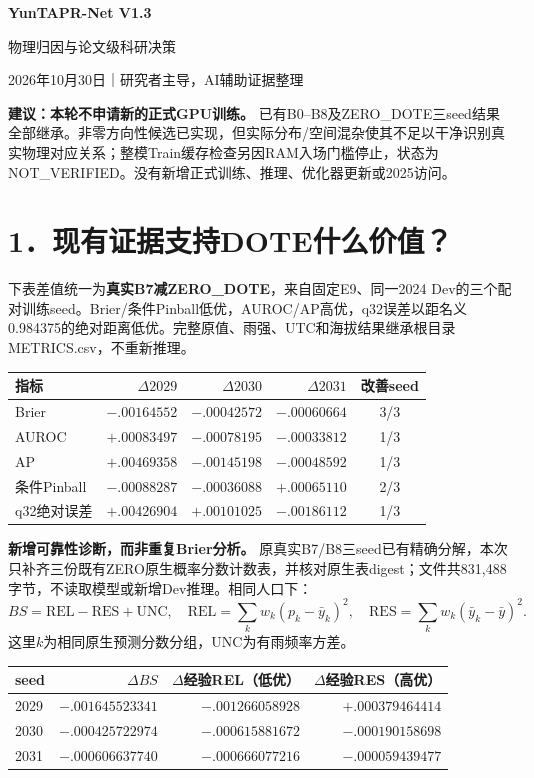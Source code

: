 \documentclass[UTF8,a4paper,10pt,fontset=none]{ctexart}
\begin{document}
{\LARGE\bfseries YunTAPR-Net V1.3}\par
{\Large 物理归因与论文级科研决策}\par
2026年10月30日｜研究者主导，AI辅助证据整理

\textbf{建议：本轮不申请新的正式GPU训练。} 已有B0--B8及ZERO\_DOTE三seed结果全部继承。非零方向性候选已实现，但实际分布/空间混杂使其不足以干净识别真实物理对应关系；整模Train缓存检查另因RAM入场门槛停止，状态为NOT\_VERIFIED。没有新增正式训练、推理、优化器更新或2025访问。

\section*{1．现有证据支持DOTE什么价值？}
下表差值统一为\textbf{真实B7减ZERO\_DOTE}，来自固定E9、同一2024 Dev的三个配对训练seed。Brier/条件Pinball低优，AUROC/AP高优，q32误差以距名义0.984375的绝对距离低优。完整原值、雨强、UTC和海拔结果继承根目录METRICS.csv，不重新推理。

\begin{center}\small
\begin{tabular}{lrrrc}
\toprule
指标 & $\Delta2029$ & $\Delta2030$ & $\Delta2031$ & 改善seed\\
\midrule
Brier & $-.00164552$ & $-.00042572$ & $-.00060664$ & 3/3\\
AUROC & $+.00083497$ & $-.00078195$ & $-.00033812$ & 1/3\\
AP & $+.00469358$ & $-.00145198$ & $-.00048592$ & 1/3\\
条件Pinball & $-.00088287$ & $-.00036088$ & $+.00065110$ & 2/3\\
q32绝对误差 & $+.00426904$ & $+.00101025$ & $-.00186112$ & 1/3\\
\bottomrule
\end{tabular}
\end{center}

\textbf{新增可靠性诊断，而非重复Brier分析。} 原真实B7/B8三seed已有精确分解，本次只补齐三份既有ZERO原生概率分数计数表，并核对原生表digest；文件共831,488字节，不读取模型或新增Dev推理。相同人口下：
\[
 BS=\mathrm{REL}-\mathrm{RES}+\mathrm{UNC},\quad
 \mathrm{REL}=\sum_k w_k(p_k-\bar y_k)^2,\quad
 \mathrm{RES}=\sum_k w_k(\bar y_k-\bar y)^2.
\]
这里$k$为相同原生预测分数分组，UNC为有雨频率方差。

\begin{center}\small
\begin{tabular}{lrrr}
\toprule
seed & $\Delta BS$ & $\Delta$经验REL（低优） & $\Delta$经验RES（高优）\\
\midrule
2029 & $-.001645523341$ & $-.001266058928$ & $+.000379464414$\\
2030 & $-.000425722974$ & $-.000615881672$ & $-.000190158698$\\
2031 & $-.000606637740$ & $-.000666077216$ & $-.000059439477$\\
\bottomrule
\end{tabular}
\end{center}
\end{document}
